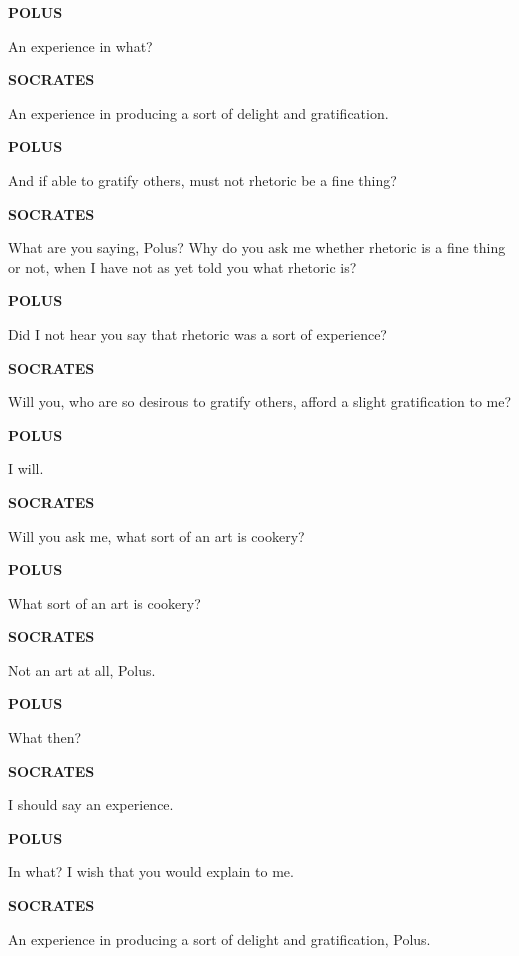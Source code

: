 \documentclass[11pt,letter]{article}
\begin{document}
\par \textbf{POLUS}
\par   An experience in what?

\par \textbf{SOCRATES}
\par   An experience in producing a sort of delight and gratification.

\par \textbf{POLUS}
\par   And if able to gratify others, must not rhetoric be a fine thing?

\par \textbf{SOCRATES}
\par   What are you saying, Polus? Why do you ask me whether rhetoric is a fine thing or not, when I have not as yet told you what rhetoric is?

\par \textbf{POLUS}
\par   Did I not hear you say that rhetoric was a sort of experience?

\par \textbf{SOCRATES}
\par   Will you, who are so desirous to gratify others, afford a slight gratification to me?

\par \textbf{POLUS}
\par   I will.

\par \textbf{SOCRATES}
\par   Will you ask me, what sort of an art is cookery?

\par \textbf{POLUS}
\par   What sort of an art is cookery?

\par \textbf{SOCRATES}
\par   Not an art at all, Polus.

\par \textbf{POLUS}
\par   What then?

\par \textbf{SOCRATES}
\par   I should say an experience.

\par \textbf{POLUS}
\par   In what? I wish that you would explain to me.

\par \textbf{SOCRATES}
\par   An experience in producing a sort of delight and gratification, Polus.
\end{document}

